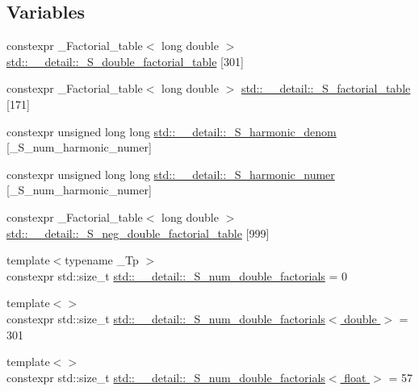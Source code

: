 \subsection*{Variables}
\begin{DoxyCompactItemize}
\item 
constexpr \+\_\+\+Factorial\+\_\+table$<$ long double $>$ \hyperlink{namespacestd_1_1____detail_a6d1131fefdb30b2746c76ff801bdc833}{std\+::\+\_\+\+\_\+detail\+::\+\_\+\+S\+\_\+double\+\_\+factorial\+\_\+table} \mbox{[}301\mbox{]}
\item 
constexpr \+\_\+\+Factorial\+\_\+table$<$ long double $>$ \hyperlink{namespacestd_1_1____detail_a008b54abe31c1027aefdfd7a76a40e99}{std\+::\+\_\+\+\_\+detail\+::\+\_\+\+S\+\_\+factorial\+\_\+table} \mbox{[}171\mbox{]}
\item 
constexpr unsigned long long \hyperlink{namespacestd_1_1____detail_ad2bdb66d93fa4433097b287c7899cd1e}{std\+::\+\_\+\+\_\+detail\+::\+\_\+\+S\+\_\+harmonic\+\_\+denom} \mbox{[}\+\_\+\+S\+\_\+num\+\_\+harmonic\+\_\+numer\mbox{]}
\item 
constexpr unsigned long long \hyperlink{namespacestd_1_1____detail_a3976bb1731d7ecfaba4601d1083d7cf6}{std\+::\+\_\+\+\_\+detail\+::\+\_\+\+S\+\_\+harmonic\+\_\+numer} \mbox{[}\+\_\+\+S\+\_\+num\+\_\+harmonic\+\_\+numer\mbox{]}
\item 
constexpr \+\_\+\+Factorial\+\_\+table$<$ long double $>$ \hyperlink{namespacestd_1_1____detail_adb3fbe0d6f7c40b02e479b63d547f57c}{std\+::\+\_\+\+\_\+detail\+::\+\_\+\+S\+\_\+neg\+\_\+double\+\_\+factorial\+\_\+table} \mbox{[}999\mbox{]}
\item 
{\footnotesize template$<$typename \+\_\+\+Tp $>$ }\\constexpr std\+::size\+\_\+t \hyperlink{namespacestd_1_1____detail_a762f5ed905d1f926bfd8b16f8ea2c568}{std\+::\+\_\+\+\_\+detail\+::\+\_\+\+S\+\_\+num\+\_\+double\+\_\+factorials} = 0
\item 
{\footnotesize template$<$$>$ }\\constexpr std\+::size\+\_\+t \hyperlink{namespacestd_1_1____detail_ae829eb6434a90060ee0650f1c71fb92d}{std\+::\+\_\+\+\_\+detail\+::\+\_\+\+S\+\_\+num\+\_\+double\+\_\+factorials$<$ double $>$} = 301
\item 
{\footnotesize template$<$$>$ }\\constexpr std\+::size\+\_\+t \hyperlink{namespacestd_1_1____detail_ac55fdd5d901fcd9335503b16ec897444}{std\+::\+\_\+\+\_\+detail\+::\+\_\+\+S\+\_\+num\+\_\+double\+\_\+factorials$<$ float $>$} = 57
\item 

\end{DoxyCompactItemize}
